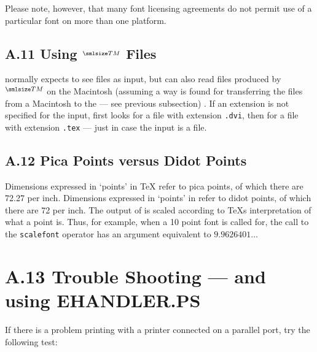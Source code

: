 Please note, however, that many font licensing agreements
do not permit use of a particular font on more than one platform.

\subsection{A.11 Using {\TeXtures}$^{\smlsize TM}$ Files} %

{\DVIPSONE} normally expects to see {\DVI} files as input, 
but can also read files produced by {\TeXtures}$^{\smlsize TM}$ on the
Macintosh (assuming a way is found for transferring the files from a
Macintosh to the {\PC} --- see previous subsection)%
.
If an extension is not specified for the input,
{\DVIPSONE} first looks for a file with extension {\tt .dvi}, then for
a file with extension {\tt .tex} --- just in case the input is a {\TeXtures}
file.



\subsection{A.12 Pica Points versus Didot Points} %

Dimensions expressed in `points' in {\TeX} refer to pica points,
of which there are 72.27 per inch.
Dimensions expressed in `points' in {\PS} refer to
didot %
points, of which there are 72 per inch.
The output of {\DVIPSONE} is scaled according to {\TeX}s interpretation
of what a point is.
Thus, for example, when a 10 point font is called for, 
the call to the {\PS} {\tt scalefont} operator 
has an argument equivalent to $9.9626401\ldots$

\section{A.13 Trouble Shooting --- and using EHANDLER.PS}

If there is a problem printing with a printer connected on a parallel
port, try the following test: %

